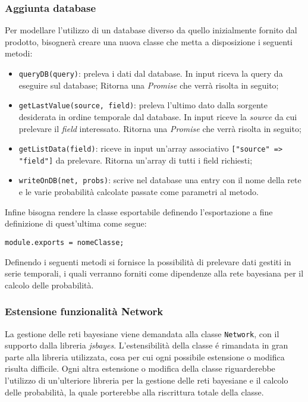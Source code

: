 \subsubsection{Aggiunta database}\label{ExtAddDB}
Per modellare l'utilizzo di un database diverso da quello inizialmente fornito dal prodotto, bisognerà creare una nuova classe che metta a disposizione i seguenti metodi: 
\begin{itemize}
 \item \texttt{queryDB(query)}: preleva i dati dal database. In input riceva la query da eseguire sul database;
 Ritorna una \textit{Promise} che verrà risolta in seguito;
 \item \texttt{getLastValue(source, field)}: preleva l'ultimo dato dalla sorgente desiderata in ordine temporale dal database. In input riceve la \textit{source} da cui prelevare il \textit{field} interessato. Ritorna una \textit{Promise} che verrà risolta in seguito;
 \item \texttt{getListData(field)}: riceve in input un'array associativo \texttt{["source" => "field"]} da prelevare. 
 Ritorna un'array di tutti i field richiesti;
 \item \texttt{writeOnDB(net, probs)}: scrive nel database una entry con il nome della rete e le varie probabilità calcolate passate come parametri al metodo.
\end{itemize}
Infine bisogna rendere la classe esportabile definendo l'esportazione a fine definizione di quest'ultima come segue: 
\begin{center}
 \texttt{module.exports = nomeClasse;}
\end{center}
Definendo i seguenti metodi si fornisce la possibilità di prelevare dati gestiti in serie temporali, i quali verranno forniti come dipendenze alla rete bayesiana per il calcolo delle probabilità. 

\subsubsection{Estensione funzionalità Network}
La gestione delle reti bayesiane viene  demandata alla classe \texttt{Network}, con il supporto dalla libreria \textit{jsbayes}. L'estensibilità della classe é rimandata in gran parte alla libreria utilizzata, cosa per cui ogni possibile estensione o modifica risulta difficile. Ogni altra estensione o modifica della classe riguarderebbe l'utilizzo di un'ulteriore libreria per la gestione delle reti bayesiane e il calcolo delle probabilità, la quale porterebbe alla riscrittura totale della classe. 



